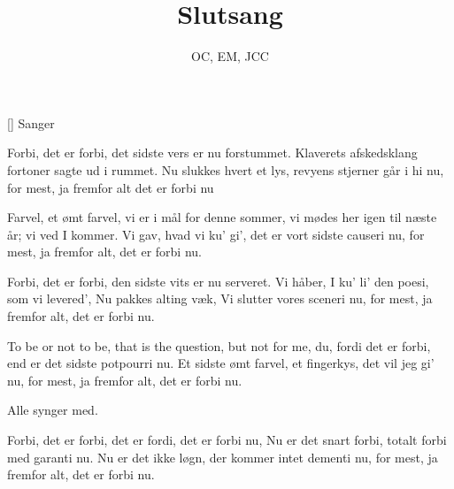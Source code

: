 \documentclass[a4paper,11pt]{article}
\title{Slutsang}
\author{OC, EM, JCC}
\begin{document}
\maketitle

\begin{roles}
[] Sanger
\end{roles}

\begin{song}
Forbi, det er forbi,
det sidste vers er nu forstummet.
Klaverets afskedsklang
fortoner sagte ud i rummet.
Nu slukkes hvert et lys,
revyens stjerner går i hi nu,
for mest, ja fremfor alt
det er forbi nu

Farvel, et ømt farvel,
vi er i mål for denne sommer,
vi mødes her igen
til næste år; vi ved I kommer.
Vi gav, hvad vi ku' gi',
det er vort sidste causeri nu,
for mest, ja fremfor alt,
det er forbi nu.

Forbi, det er forbi,
den sidste vits er nu serveret.
Vi håber, I ku' li'
den poesi, som vi levered',
Nu pakkes alting væk,
Vi slutter vores sceneri nu,
for mest, ja fremfor alt,
det er forbi nu.

To be or not to be,
that is the question, but not for me, du,
fordi det er forbi,
end er det sidste potpourri nu.
Et sidste ømt farvel,
et fingerkys, det vil jeg gi' nu,
for mest, ja fremfor alt,
det er forbi nu.

{\scene Alle synger med.}

Forbi, det er forbi,
det er fordi, det er forbi nu,
Nu er det snart forbi, totalt forbi
med garanti nu.
Nu er det ikke løgn,
der kommer intet dementi nu,
for mest, ja fremfor alt,
det er forbi nu.
\end{song}
\end{document}
